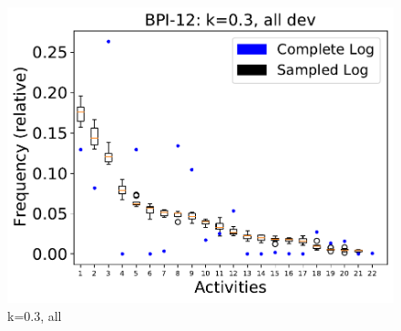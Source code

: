 \documentclass[landscape]{article}
\begin{document}
\begin{figure}[!htb]
\begin{minipage}{0.2\textwidth}
		\includegraphics[width=1.0\textwidth]{../BPI_Challenge_2012/BPI_Challenge_2012_deviationsApprox_0.3_NONALIGNING_ALL.pdf}
		\caption{k=0.3, all}
	\end{minipage}
\end{figure}
	\newpage
\end{document}
